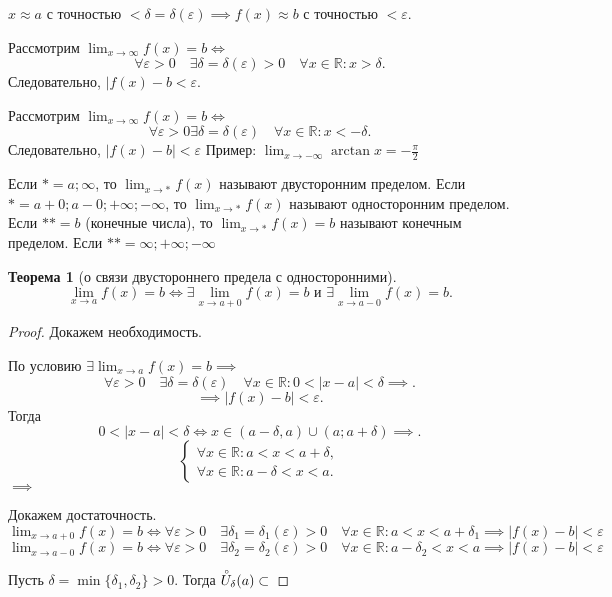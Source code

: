 \documentclass[a4paper,12pt]{article} %
\newtheorem{theorem}{Теорема}[subsection]
\theoremstyle{remark}
\begin{document}
	$x \approx a$ с точностью $<\delta=\delta(\varepsilon) \implies f(x)\approx b$ с точностью $<\varepsilon$.

	Рассмотрим $\lim_{x \to \infty} f(x) = b \iff$
	\[
	\forall \varepsilon>0 \quad \exists \delta=\delta(\varepsilon) > 0 \quad \forall x \in \mathbb{R} : x > \delta
	.\] 
	Следовательно, $|f(x) - b < \varepsilon$.

	Рассмотрим $\lim_{x \to \infty} f(x) = b \iff$
	\[
	\forall \varepsilon > 0 \exists \delta=\delta(\varepsilon) \quad \forall x\in \mathbb{R} : x < -\delta
	.\] 
	Следовательно, $|f(x) - b| < \varepsilon$
	Пример: $\lim_{x \to -\infty} \arctan{x} = - \frac{\pi}{2}$

	Если $* = a; \infty$, то $\lim_{x \to *} f(x)$ называют двусторонним пределом.
	Если $* = a+0; a-0; +\infty; -\infty$, то $\lim_{x \to *} f(x)$ называют односторонним пределом.
	Если $** = b$ (конечные числа), то $\lim_{x \to *} f(x) = b$ называют конечным пределом.
	Если $** = \infty; +\infty; -\infty$

\begin{theorem}[о связи двустороннего предела с односторонними]
	\[
		\lim_{x \to a} f(x) = b \iff \exists \lim_{x \to a+0} f(x) = b \text{ и } \exists \lim_{x \to a-0} f(x) = b
	.\]
\end{theorem}
\begin{proof}
	Докажем необходимость.

	По условию $\exists  \lim_{x \to a} f(x) = b \implies $
	\[
	\forall \varepsilon>0 \quad \exists \delta=\delta(\varepsilon) \quad \forall x\in \mathbb{R} : 0 < |x-a| < \delta \implies
	.\] 
	\[
	\implies |f(x) - b| < \varepsilon
	.\] 
Тогда
\[
0 < |x-a| < \delta \iff x \in (a-\delta, a) \cup (a; a + \delta) \implies
.\] 
\[
\begin{cases}
	\forall x \in  \mathbb{R} : a < x < a+\delta, \\
	\forall x \in  \mathbb{R} : a-\delta < x < a.
\end{cases}
\]
$\implies $

Докажем достаточность.
$\lim_{x \to a+0} f(x) = b \iff \forall \varepsilon>0 \quad \exists \delta_1 = \delta_1(\varepsilon)>0 \quad \forall x\in \mathbb{R} : a < x < a+\delta_1 \implies |f(x) - b| < \varepsilon$
$\lim_{x \to a-0} f(x) = b \iff \forall \varepsilon>0 \quad \exists \delta_2 = \delta_2(\varepsilon)>0 \quad \forall x\in \mathbb{R} : a -\delta_2 < x < a \implies |f(x) - b| < \varepsilon$

Пусть $\delta = \min \{\delta_1, \delta_2\} > 0$. Тогда $\accentset{\circ}{U}_\delta(a)\subset  $
\end{proof}
\end{document}
